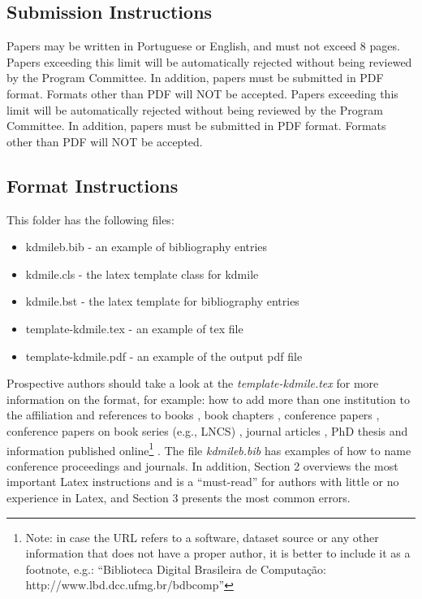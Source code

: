 \documentclass[kdmile,a4paper]{kdmile} %
\begin{document}
\subsection{Submission Instructions}

Papers may be written in Portuguese or English, and must not exceed 8 pages. Papers exceeding this limit will be automatically rejected without being reviewed by the Program Committee. In addition, papers must be submitted in PDF format. Formats other than PDF will NOT be accepted.
Papers exceeding this limit will be automatically rejected without being reviewed by the Program Committee. In addition, papers must be submitted in PDF format. Formats other than PDF will NOT be accepted. 



\subsection{Format Instructions}


This folder has the following files:

\begin{itemize}
	\item kdmileb.bib - an example of bibliography entries
	\item kdmile.cls - the latex template class for kdmile
	\item kdmile.bst - the latex template for bibliography entries
	\item template-kdmile.tex - an example of tex file
	\item template-kdmile.pdf - an example of the output pdf file
\end{itemize}

Prospective authors should take a look at the \textit{template-kdmile.tex} for more information on the format, for example: how to add more than one institution to the affiliation and  references to books \cite{Baeza-YatesR99}, book chapters \cite{BorgidaCL09}, conference papers \cite{FerreiraGALV09}, conference papers on book series (e.g., LNCS) \cite{SilvaLC96}, journal articles \cite{LaenderMNM09}, PhD thesis \cite{Moro07} and information published online\footnote{Note: in case the URL refers to a software, dataset source or any other information that does not have a proper author, it is better to include it as a footnote, e.g.: ``Biblioteca Digital Brasileira de Computa\c{c}\~{a}o: http://www.lbd.dcc.ufmg.br/bdbcomp''} \cite{xpath}. The file \textit{kdmileb.bib} has examples of how to name conference proceedings and journals. In addition, Section 2 overviews the most important Latex instructions and is a ``must-read'' for authors with little or no experience in Latex, and Section 3 presents the most common errors.
\end{document}
